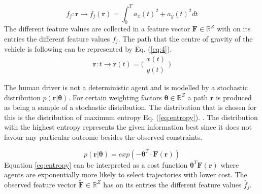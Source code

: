 \begin{equation}\label{eq:3}
f_j:\bm{r}\xrightarrow{}f_j(\bm{r})=\int_{0}^{T}a_x(t)^{2}+a_y(t)^{2} dt
\end{equation}
The different feature values are collected in a feature vector $\bm{F} \in \mathbb{R}^Z$ with on its entries the different feature values $f_j$.
The path that the centre of gravity of the vehicle is following can be represented by Eq. (\ref{eq:4}).
\begin{equation}\label{eq:4}
\bm{r}:t \xrightarrow{}\bm{r}(t) =  \bigl( \begin{smallmatrix} x(t)\\ y(t) \end{smallmatrix}\bigr)
\end{equation}

The human driver is not a deterministic agent and is modelled by a stochastic distribution $p(\bm{r}|\bm{\theta})$. For certain weighting factors $\bm{\theta} \in \mathbb{R}^Z$ a path $\bm{r}$ is produced as being a sample of a stochastic distribution. The distribution that is chosen for this is the distribution of maximum entropy Eq. (\ref{eq:entropy}). \cite{Ziebart2008}. 
The distribution with the highest entropy represents the given information best since it does not favour any particular outcome besides the observed constraints. \cite{Abbeel2004}
	
\begin{equation}\label{eq:entropy}
	p(\bm{r}|\bm{\theta}) = exp(-\bm{\theta}^T\cdot \bm{F}(\bm{r}))
\end{equation}
Equation \ref{eq:entropy} can be interpreted as a cost function $\bm{\theta}^T\bm{F}(\bm{r})$ where agents are exponentially more likely to select trajectories with lower cost. \cite{Kuderer2015a}
The observed feature vector $\tilde{\bm{F}} \in \mathbb{R}^Z$ has on its entries the different feature values $\tilde{f_j}$. 


